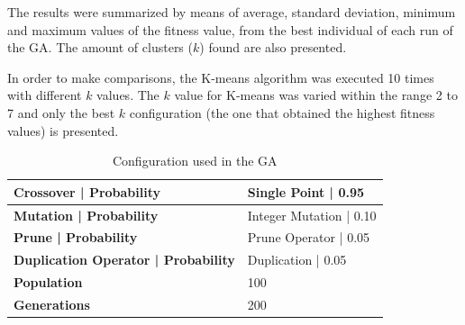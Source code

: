 \documentclass[journal]{IEEEtran}
\begin{document}
	The results were summarized by means of average, standard deviation, minimum and maximum values of the fitness value, from the best individual of each run of the GA. The amount of clusters ($k$) found are also presented.
	
	In order to make comparisons, the K-means algorithm was executed 10 times with different $k$ values. The $k$ value for K-means was varied within the range 2 to 7 and only the best $k$ configuration (the one that obtained the highest fitness values) is presented. 
	
	\begin{table}[]
		\centering
		\caption{Configuration used in the GA}
		\label{ga-configuration}
		\begin{tabular}{|l|l|}
			\hline
			\textbf{Crossover  |  Probability}         & Single Point  | 0.95     \\ \hline
			\textbf{Mutation | Probability}            & Integer Mutation          |  0.10 \\ \hline
			\textbf{Prune  | Probability}      & Prune Operator           | 0.05   \\ \hline
			\textbf{Duplication Operator | Probability} & Duplication   | 0.05     \\ \hline
			\textbf{Population}                        & 100                               \\ \hline
			\textbf{Generations}                       & 200                               \\ \hline
		\end{tabular}
	\end{table}
	
\end{document}
